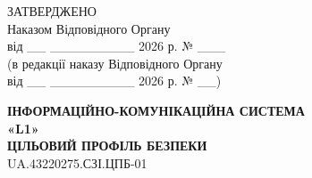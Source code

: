 \documentclass[10pt]{article}
\begin{document}
\begin{flushright}
ЗАТВЕРДЖЕНО\\
Наказом Відповідного Органу\\
від \_\_ \_\_\_\_\_\_\_\_\_ 2026 р. № \_\_\_\\
(в редакції наказу Відповідного Органу\\
від \_\_ \_\_\_\_\_\_\_\_\_ 2026 р. № \_\_)
\end{flushright}

\vspace{2cm}

\begin{center}
\textbf{\Large ІНФОРМАЦІЙНО-КОМУНІКАЦІЙНА СИСТЕМА}\\
\textbf{\Large «L1»}\\
\vspace{1cm}
\textbf{\Large ЦІЛЬОВИЙ ПРОФІЛЬ БЕЗПЕКИ}\\
\vspace{0.5cm}
\large UA.43220275.СЗІ.ЦПБ-01
\end{center}

\newpage
\end{document}
